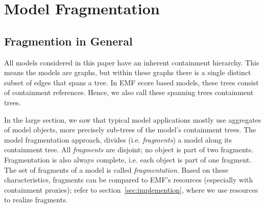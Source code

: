 \section{Model Fragmentation}
\label{sec:fragmentation}

\subsection{Fragmention in General}
All models considered in this paper have an inherent containment hierarchy. This means the models are graphs, but within these graphs there is a single distinct subset of edges that spans a tree. In EMF ecore based models, these trees consist of containment references. Hence, we also call these spanning trees containment trees.

In the large section, we saw that typical model applications mostly use aggregates of model objects, more precisely sub-trees of the model's containment trees. The model fragmentation approach, divides (i.e. \emph{fragments}) a model along its containment tree. All \emph{fragments} are disjoint; no object is part of two fragments. Fragmentation is also always complete, i.e. each object is part of one fragment. The set of fragments of a model is called \emph{fragmentation}. Based on these characteristics, fragments can be compared to EMF's resources (especially with containment proxies); refer to section~\ref{sec:implemention}, where we use resources to realize fragments.

